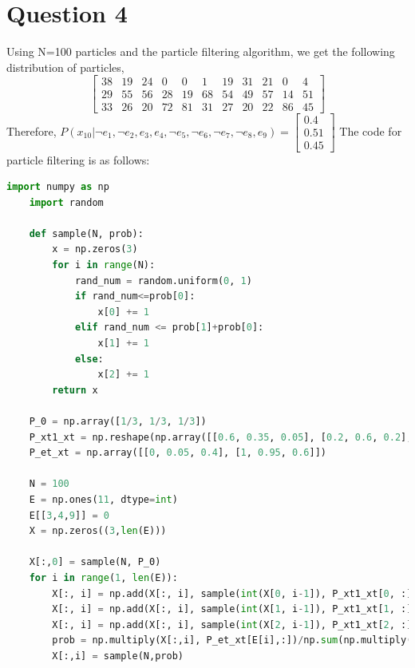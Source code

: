 \documentclass[letter, 9pt]{article}
\begin{document}
\section*{Question 4}Using N=100 particles and the particle filtering algorithm, we get the following distribution of particles,
\begin{equation*}
    \begin{bmatrix}
    38 & 19 & 24 & 0 & 0 & 1 & 19 & 31 & 21 & 0 & 4\\
    29 & 55 & 56 & 28 & 19 & 68 & 54 & 49 & 57 & 14 & 51\\
    33 & 26 & 20 & 72 & 81 & 31 & 27 & 20 & 22 & 86 & 45
    \end{bmatrix}
\end{equation*}
Therefore, $P(x_{10}|\neg e_1, \neg e_2, e_3, e_4, \neg e_5, \neg e_6, \neg e_7, \neg e_8, e_9) = \begin{bmatrix}0.4\\0.51\\0.45\end{bmatrix}$
The code for particle filtering is as follows:
\begin{lstlisting}[language=Python]
    import numpy as np
    import random
    
    def sample(N, prob):
        x = np.zeros(3)
        for i in range(N):
            rand_num = random.uniform(0, 1)
            if rand_num<=prob[0]:
                x[0] += 1
            elif rand_num <= prob[1]+prob[0]:
                x[1] += 1
            else:
                x[2] += 1
        return x
    
    P_0 = np.array([1/3, 1/3, 1/3])
    P_xt1_xt = np.reshape(np.array([[0.6, 0.35, 0.05], [0.2, 0.6, 0.2], [0, 0.5, 0.5]]), (3, 3))
    P_et_xt = np.array([[0, 0.05, 0.4], [1, 0.95, 0.6]])

    N = 100
    E = np.ones(11, dtype=int)
    E[[3,4,9]] = 0
    X = np.zeros((3,len(E)))
    
    X[:,0] = sample(N, P_0)
    for i in range(1, len(E)):
        X[:, i] = np.add(X[:, i], sample(int(X[0, i-1]), P_xt1_xt[0, :]))
        X[:, i] = np.add(X[:, i], sample(int(X[1, i-1]), P_xt1_xt[1, :]))
        X[:, i] = np.add(X[:, i], sample(int(X[2, i-1]), P_xt1_xt[2, :]))
        prob = np.multiply(X[:,i], P_et_xt[E[i],:])/np.sum(np.multiply(X[:,i], P_et_xt[E[i],:]))
        X[:,i] = sample(N,prob)
\end{lstlisting}

\newpage
\end{document}
